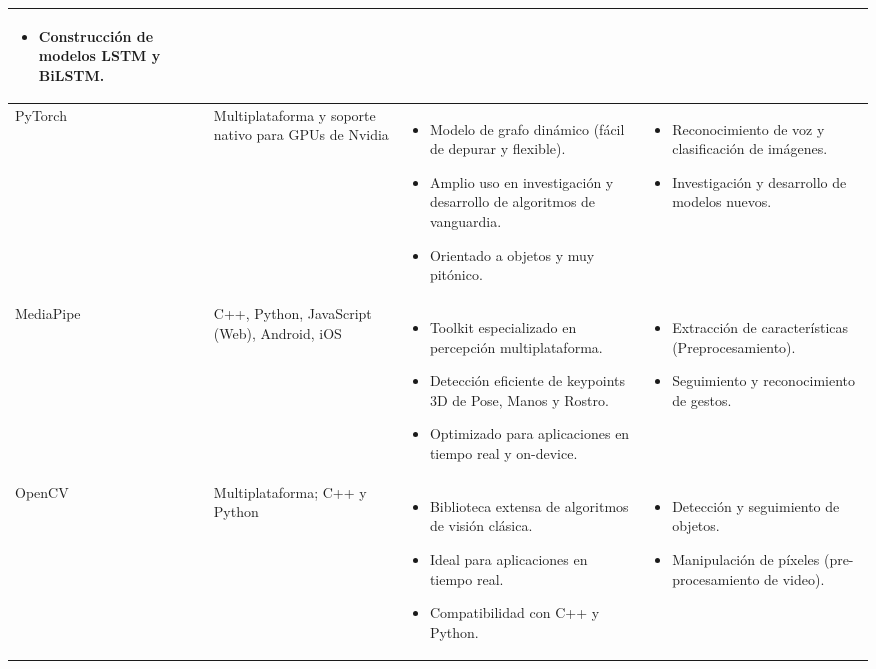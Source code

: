 \begin{table}[H]
\begin{tabular}{|p{1.8cm}|p{2.5cm}|p{6.5cm}|p{5cm}|}
\begin{itemize}
            \item Construcción de modelos LSTM y BiLSTM.
        \end{itemize} \\
        \hline
        PyTorch &
        Multiplataforma y soporte nativo para GPUs de Nvidia &
        \begin{itemize}
            \item Modelo de grafo dinámico (fácil de depurar y flexible).
            \item Amplio uso en investigación y desarrollo de algoritmos de vanguardia.
            \item Orientado a objetos y muy pitónico.
        \end{itemize} &
        \begin{itemize}
            \item Reconocimiento de voz y clasificación de imágenes.
            \item Investigación y desarrollo de modelos nuevos.
        \end{itemize} \\
        \hline
        MediaPipe &
        C++, Python, JavaScript (Web), Android, iOS &
        \begin{itemize}
            \item Toolkit especializado en percepción multiplataforma.
            \item Detección eficiente de keypoints 3D de Pose, Manos y Rostro.
            \item Optimizado para aplicaciones en tiempo real y on-device.
        \end{itemize} &
        \begin{itemize}
            \item Extracción de características (Preprocesamiento).
            \item Seguimiento y reconocimiento de gestos.
        \end{itemize} \\
        \hline
        OpenCV &
        Multiplataforma; C++ y Python &
        \begin{itemize}
            \item Biblioteca extensa de algoritmos de visión clásica.
            \item Ideal para aplicaciones en tiempo real.
            \item Compatibilidad con C++ y Python.
        \end{itemize} &
        \begin{itemize}
            \item Detección y seguimiento de objetos.
            \item Manipulación de píxeles (pre-procesamiento de video).
        \end{itemize} \\
        \hline
    \end{tabular}
\end{table}

